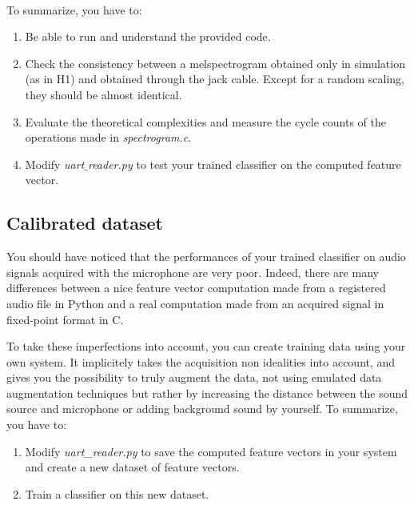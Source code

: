 \\
%
\noindent To summarize, you have to:
\begin{enumerate}
    \item Be able to run and understand the provided code.
    \item Check the consistency between a melspectrogram obtained only in simulation (as in H1) and obtained through the jack cable. Except for a random scaling, they should be almost identical.
    \item Evaluate the theoretical complexities and measure the cycle counts of the operations made in \emph{spectrogram.c}.
    \item Modify \emph{uart$\_$reader.py} to test your trained classifier on the computed feature vector.
\end{enumerate}
%
\subsection{Calibrated dataset}
%
You should have noticed that the performances of your trained classifier on audio signals acquired with the microphone are very poor. Indeed, there are many differences between a nice feature vector computation made from a registered audio file in Python and a real computation made from an acquired signal in fixed-point format in C.

To take these imperfections into account, you can create training data using your own system. It implicitely takes the acquisition non idealities into account, and gives you the possibility to truly augment the data, not using emulated data augmentation techniques but rather by increasing the distance between the sound source and microphone or adding background sound by yourself.
%
\noindent To summarize, you have to:
\begin{enumerate}
    \item Modify \emph{uart\_reader.py} to save the computed feature vectors in your system and create a new dataset of feature vectors.
    \item Train a classifier on this new dataset.
\end{enumerate}
